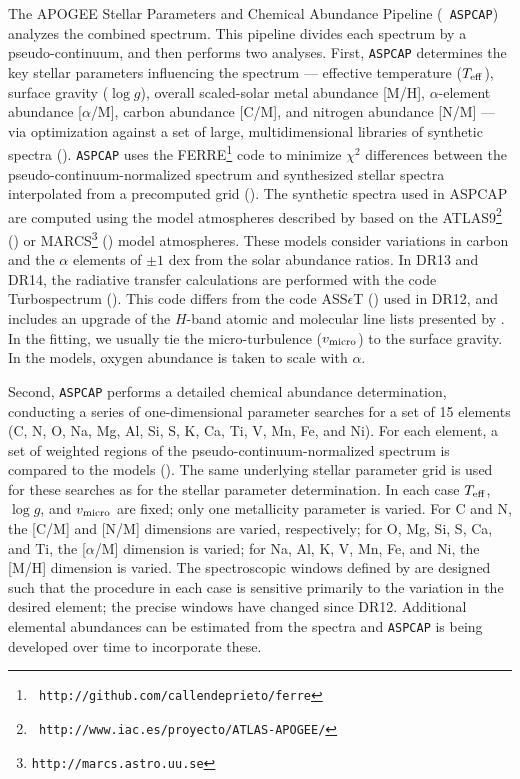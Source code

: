 The APOGEE Stellar Parameters and Chemical Abundance Pipeline ({\tt
  ASPCAP}) analyzes the combined spectrum.  This pipeline divides each
spectrum by a pseudo-continuum, and then performs two analyses.
First, {\tt ASPCAP} determines the key stellar parameters influencing
the spectrum --- effective temperature ($T_{\rm eff}$), surface
gravity ($\log g$), overall scaled-solar metal abundance [M/H],
$\alpha$-element abundance [$\alpha$/M], carbon abundance [C/M], and
nitrogen abundance [N/M] --- via optimization against a set of large,
multidimensional libraries of synthetic spectra (\citealt{zamora15a}).
{\tt ASPCAP} uses the FERRE\footnote{\tt
  http://github.com/callendeprieto/ferre} code to minimize $\chi^2$
differences between the pseudo-continuum-normalized spectrum and
synthesized stellar spectra interpolated from a precomputed grid
(\citealt{allendeprieto06a}). The synthetic spectra used in ASPCAP are
computed using the model atmospheres described by \citet{meszaros12a}
based on the ATLAS9\footnote{\tt
  http://www.iac.es/proyecto/ATLAS-APOGEE/} (\citealt{kurucz79a}) or
MARCS\footnote{\tt http://marcs.astro.uu.se} (\citealt{gustafsson08a})
model atmospheres. These models consider variations in carbon and the
$\alpha$ elements of $\pm 1$ dex from the solar abundance ratios. In
DR13 and DR14, the radiative transfer calculations are performed with
the code Turbospectrum (\citealt{alvarez98a, plez12a}). This code
differs from the code ASS$\epsilon$T (\citealt{koesterke09a}) used in
DR12, and includes an upgrade of the $H$-band atomic and molecular
line lists presented by \citet{shetrone15a}. In the fitting, we
usually tie the micro-turbulence ($v_{\rm micro}$) to the surface
gravity.  In the models, oxygen abundance is taken to scale with
$\alpha$.

Second, {\tt ASPCAP} performs a detailed chemical abundance
determination, conducting a series of one-dimensional parameter
searches for a set of 15 elements (C, N, O, Na, Mg, Al, Si, S, K, Ca,
Ti, V, Mn, Fe, and Ni).  For each element, a set of weighted regions
of the pseudo-continuum-normalized spectrum is compared to the models
(\citealt{garciaperez16a}).  The same underlying stellar parameter
grid is used for these searches as for the stellar parameter
determination. In each case $T_{\rm eff}$, $\log g$, and $v_{\rm
  micro}$ are fixed; only one metallicity parameter is varied. For C
and N, the [C/M] and [N/M] dimensions are varied, respectively; for O,
Mg, Si, S, Ca, and Ti, the [$\alpha$/M] dimension is varied; for Na,
Al, K, V, Mn, Fe, and Ni, the [M/H] dimension is varied. The spectroscopic
windows defined by \citet{garciaperez16a} are designed such that the
procedure in each case is sensitive primarily to the variation in the
desired element; the precise windows have changed since
DR12. Additional elemental abundances can be estimated from the
spectra and {\tt ASPCAP} is being developed over time to incorporate
these.

